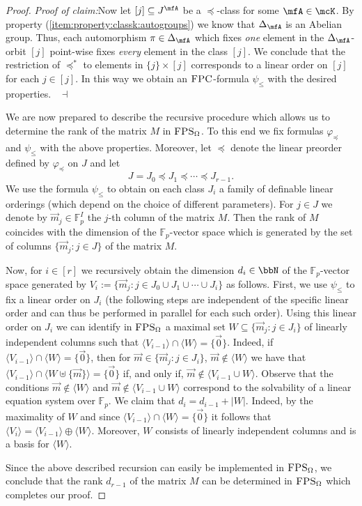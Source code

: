 \documentclass[a4paper,UKenglish]{lipics}
\newcommand{\defeq}{:=}
\newcommand{\inseg}[1]{\ensuremath{[#1]}}
\newcommand{\card}[1]{\ensuremath{|#1|}}
\newcommand{\gengroup}[1]{\langle #1 \rangle}
\newcommand{\field}[1]{\mathbb{#1}}
\newcommand{\zerovec}{\ensuremath{\vec{0}}}
\newcommand{\N}{\ensuremath{\bbN}}
\newcommand{\logic}[1]{\ensuremath{\textsc{#1}}\xspace}
\newcommand{\FPC}{\logic{FPC}}
\newcommand{\FPSx}[1]{\ensuremath{\logic{FPS}_{#1}}\xspace}
\renewcommand{\phi}{\varphi}
\newcommand{\vct}[1]{\vec{#1}}
\theoremstyle{plain}
\newenvironment{claimproof}[1]{\par\noindent\textit{Proof of 
claim:}\space#1}
{\leavevmode\unskip\penalty9999 \hbox{}\nobreak\hfill\quad\hbox{
$\dashv$}}
\begin{document}
\begin{proof}
\begin{claimproof}
Now let $[j] \subseteq J^\mfA$ be a $\preceq$-class for some $\mfA \in 
\mcK$. 
By property (\ref{item:property:classk:autogroups}) we know that 
$\Delta_\mfA$ is an Abelian group. Thus, each automorphism $\pi \in 
\Delta_\mfA$ which fixes \emph{one} element in the 
$\Delta_\mfA$-orbit $[j]$ point-wise 
fixes \emph{every} element in the class $[j]$. 
We conclude that the restriction of $\preceq^*$ to elements in $\{j \} 
\times [j]$ corresponds to a linear order on $[j]$ for each $j \in [j]$.
In this way we obtain an \FPC-formula $\psi_\leq$ with the desired 
properties.
\end{claimproof}

\smallskip
We are now prepared to describe the recursive procedure which allows us to 
determine the rank of the matrix $M$ in $\FPSx{\Omega}$.
To this end we fix formulas $\phi_\preceq$ and $\psi_\leq$ with the above 
properties. Moreover, let $\preceq$ denote the linear preorder defined by 
$\phi_\preceq$ on $J$ and let
\[ J = J_0 \preceq J_1 \preceq \cdots \preceq J_{r-1}.\]
We use the formula $\psi_\leq$ to obtain on each class $J_i$ a 
family of definable linear orderings (which depend on the choice of 
different parameters).
For $j \in J$ we denote by $\vct{m}_j \in \field F_p^I$ the $j$-th column of 
the matrix $M$. Then the rank of $M$ coincides with the dimension of the 
$\field F_p$-vector space which is generated by the set of columns $\{ \vct m_j 
: j \in J\}$ of the matrix $M$.

Now, for $i \in \inseg r$ we recursively obtain the 
dimension $d_i \in \N$ of the $\field F_p$-vector space generated by 
$V_i \defeq \{ \vct m_j : j \in J_0 \cup J_1 \cup \cdots \cup J_i\}$ as 
follows.
First, we use $\psi_\leq$ to fix a linear order on $J_i$ (the following 
steps are independent of the specific linear order and can thus be 
performed in parallel for each such order).
Using this linear order on $J_i$ we can identify in $\FPSx{\Omega}$ a maximal 
set 
$W \subseteq \{ \vec m_j : j \in J_i\}$ of linearly independent columns 
such that $\gengroup {V_{i-1}} \cap \gengroup W = \{ \zerovec \}$.
Indeed, if $\gengroup {V_{i-1}} \cap \gengroup W = \{ \zerovec \}$, then 
for $\vec m \in \{ \vec m_j : j \in J_i\}$, $\vec m \nin \gengroup W$
we have that 
$\gengroup {V_{i-1}} \cap \gengroup {W \uplus \{ \vec m \}} = \{ \zerovec 
\}$ if, and only if, $\vec m \nin \gengroup { V_{i-1} \cup W}$. Observe 
that the conditions $\vec m \nin \gengroup W$ and $\vec m \nin \gengroup { 
V_{i-1} \cup W}$ correspond to the solvability of a linear equation system 
over $\field F_p$.
We claim that $d_i = d_{i-1} + \card W$. Indeed, by the 
maximality of $W$ and since $\gengroup{ V_{i-1}} \cap \gengroup W = \{ 
\zerovec \}$ it follows that $\gengroup {V_i} = \gengroup {V_{i-1} } 
\oplus \gengroup W$. Moreover, $W$ consists of linearly independent 
columns and is a basis for $\gengroup W$.

Since the above described recursion can easily be implemented in 
$\FPSx{\Omega}$, we conclude that the rank $d_{r-1}$ of the matrix $M$ can be 
determined in $\FPSx{\Omega}$ which completes our proof.
\end{proof}
\end{document}
